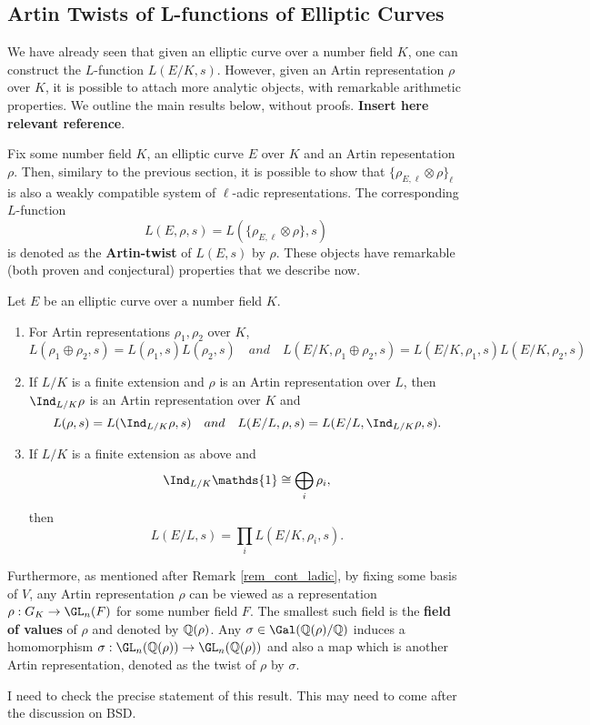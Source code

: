 \subsection{Artin Twists of L-functions of Elliptic Curves}

We have already seen that given an elliptic curve over a number field $K$, one can construct the $L$-function $L(E/K,s)$. However, given an Artin representation $\rho$ over $K$, it is possible to attach more analytic objects, with remarkable arithmetic properties. We outline the main results below, without proofs. \textbf{Insert here relevant reference}. 

Fix some number field $K$, an elliptic curve $E$ over $K$ and an Artin repesentation $\rho$. Then, similary to the previous section, it is possible to show that $\{\rho_{E,\ell}\otimes\rho\}_\ell$ is also a weakly compatible system of $\ell$-adic representations. The corresponding $L$-function
$$L(E,\rho,s)=L(\{\rho_{E,\ell}\otimes\rho\},s)$$
is denoted as the \textbf{Artin-twist} of $L(E,s)$ by $\rho$. These objects have remarkable (both proven and conjectural) properties that we describe now.

\begin{thm}
    Let $E$ be an elliptic curve over a number field $K$.
    \begin{enumerate}
        \item For Artin representations $\rho_1,\rho_2$ over $K$,
        $$L(\rho_1\oplus\rho_2,s)=L(\rho_1,s)L(\rho_2,s)\quad and\quad L(E/K,\rho_1\oplus\rho_2,s)=L(E/K,\rho_1,s)L(E/K,\rho_2,s)$$
        \item If $L/K$ is a finite extension and $\rho$ is an Artin representation over $L$, then $\Ind_{L/K}\rho$ is an Artin representation over $K$ and 
        $$L(\rho,s)=L(\Ind_{L/K}\rho,s)\quad and\quad L(E/L,\rho,s)=L(E/L,\Ind_{L/K}\rho,s).$$
        \item If $L/K$ is a finite extension as above and 
        $$\Ind_{L/K}\mathds{1}\cong\bigoplus_i\rho_i,$$
        then
        $$L(E/L,s)=\prod_i L(E/K,\rho_i,s).$$
    \end{enumerate}
\end{thm}

Furthermore, as mentioned after Remark \ref{rem_cont_ladic}, by fixing some basis of $V$, any Artin representation $\rho$ can be viewed as a representation $\rho:G_K\to\GL_n(F)$ for some number field $F$. The smallest such field is the \textbf{field of values} of $\rho$ and denoted by $\mathbb{Q}(\rho)$. Any $\sigma\in\Gal(\QQ(\rho)/\QQ)$ induces a homomorphism $\sigma:\GL_n(\QQ(\rho))\to\GL_n(\QQ(\rho))$ and also a map
which is another Artin representation, denoted as the twist of $\rho$ by $\sigma$.

\begin{conj}
    I need to check the precise statement of this result. This may need to come after the discussion on BSD.
\end{conj}
